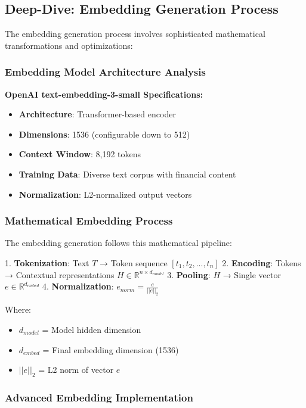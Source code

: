 \documentclass[12pt,a4paper]{article}
\begin{document}
\subsection{Deep-Dive: Embedding Generation Process}

The embedding generation process involves sophisticated mathematical transformations and optimizations:

\subsubsection{Embedding Model Architecture Analysis}

\textbf{OpenAI text-embedding-3-small Specifications:}
\begin{itemize}
    \item \textbf{Architecture}: Transformer-based encoder
    \item \textbf{Dimensions}: 1536 (configurable down to 512)
    \item \textbf{Context Window}: 8,192 tokens
    \item \textbf{Training Data}: Diverse text corpus with financial content
    \item \textbf{Normalization}: L2-normalized output vectors
\end{itemize}

\subsubsection{Mathematical Embedding Process}

The embedding generation follows this mathematical pipeline:

1. \textbf{Tokenization}: Text $T$ → Token sequence $[t_1, t_2, ..., t_n]$
2. \textbf{Encoding}: Tokens → Contextual representations $H \in \mathbb{R}^{n \times d_{model}}$
3. \textbf{Pooling}: $H$ → Single vector $e \in \mathbb{R}^{d_{embed}}$
4. \textbf{Normalization}: $e_{norm} = \frac{e}{||e||_2}$

Where:
\begin{itemize}
    \item $d_{model}$ = Model hidden dimension
    \item $d_{embed}$ = Final embedding dimension (1536)
    \item $||e||_2$ = L2 norm of vector $e$
\end{itemize}

\subsubsection{Advanced Embedding Implementation}
\end{document}
